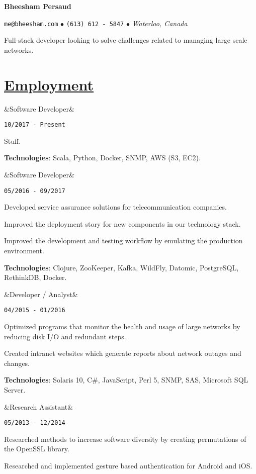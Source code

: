 \documentclass[11pt]{article} %
\newcommand{\heading}[1]{
    \section*{\uline{\hfill #1 }} %
}
\newcommand{\squish}{
\setlength{\itemsep}{0.2pt}
    \setlength{\parskip}{0pt} %
    \setlength{\parsep}{0.2pt}
}
\newcommand{\when}[1]{ %
    \hfill \texttt{#1}
}
\newcommand{\experience}[3]{ %
    \ifx&#2&
\item[{#1}]
    \else
\item[{#1}, \emph{#2}]
    \fi
    \when{#3}
}
\newcommand{\contact}[3]{
    \centerline{ \large \texttt{#1} $\bullet$ \texttt{#2} $\bullet$ \emph{#3} }
    \vspace{0.1in}
}
\newcommand{\technologies}[1]{
    {\small \textbf{Technologies}: #1.}
}
\begin{document}
\centerline{{\huge \bf Bheesham Persaud}}
\bigskip

\contact{me@bheesham.com}
        {(613) 612 - 5847}
        {Waterloo, Canada}

Full-stack developer looking to solve challenges related to managing large
scale networks.

\heading{Employment}%

\begin{description}
        \squish

        \experience{Auvik Networks}
                   {Software Developer}
                   {10/2017 - Present}

        Stuff.

        \technologies{Scala, Python, Docker, SNMP, AWS (S3, EC2)}

        \experience{CENX}
                   {Software Developer}
                   {05/2016 - 09/2017}

        Developed service assurance solutions for telecommunication companies.

        Improved the deployment story for new components in our technology
        stack.

        Improved the development and testing workflow by emulating the
        production environment.

        \technologies{Clojure, ZooKeeper, Kafka, WildFly, Datomic, PostgreSQL,
        RethinkDB, Docker}

        \experience{Shared Services Canada}
                   {Developer / Analyst}
                   {04/2015 - 01/2016}

           Optimized programs that monitor the health and usage of large
           networks by reducing disk I/O and redundant steps.
           
           Created intranet websites which generate reports about network
           outages and changes.
           
           \technologies{Solaris 10, C\#, JavaScript, Perl 5, SNMP, SAS,
           Microsoft SQL Server}

        \experience{Carleton University}
                   {Research Assistant}
                   {05/2013 - 12/2014}

            Researched methods to increase software diversity by creating
            permutations of the OpenSSL library.

            Researched and implemented gesture based authentication for Android
            and iOS.
            

\end{description}
\end{document}
